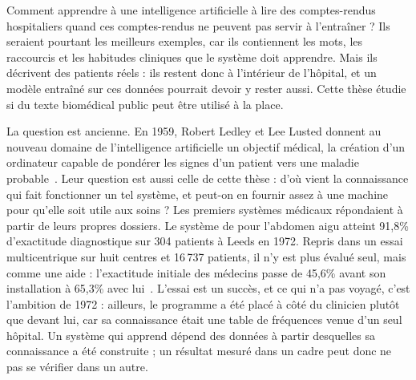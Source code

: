 

\noindent Comment apprendre à une intelligence artificielle à lire des comptes-rendus
hospitaliers quand ces comptes-rendus ne peuvent pas servir à l'entraîner ? Ils
seraient pourtant les meilleurs exemples, car ils contiennent les mots, les
raccourcis et les habitudes cliniques que le système doit apprendre. Mais ils
décrivent des patients réels : ils restent donc à l'intérieur de l'hôpital, et un
modèle entraîné sur ces données pourrait devoir y rester aussi. Cette thèse étudie
si du texte biomédical public peut être utilisé à la place.

La question est ancienne. En 1959, Robert Ledley et Lee Lusted donnent au nouveau
domaine de l'intelligence artificielle un objectif médical, la création d'un ordinateur capable
de pondérer les signes d'un patient vers une maladie probable~\citep{ledley_lusted_1959}.
Leur question est aussi celle de cette thèse : d'où vient la connaissance qui fait
fonctionner un tel système, et peut-on en fournir assez à une machine pour qu'elle
soit utile aux soins ? Les premiers systèmes médicaux répondaient à partir de leurs
propres dossiers. Le système de \citet{dedombal_1972} pour l'abdomen aigu atteint
91,8\% d'exactitude diagnostique sur 304 patients à Leeds en 1972. Repris dans un
essai multicentrique sur huit centres et 16\,737 patients, il n'y est plus évalué
seul, mais comme une aide : l'exactitude initiale des médecins passe de 45,6\% avant
son installation à 65,3\% avec lui~\citep{adams_1986}. L'essai est un succès, et ce
qui n'a pas voyagé, c'est l'ambition de 1972 : ailleurs, le programme a été placé à
côté du clinicien plutôt que devant lui, car sa connaissance était une table de
fréquences venue d'un seul hôpital. Un système qui apprend dépend des données à partir desquelles
sa connaissance a été construite ; un résultat mesuré dans un cadre peut donc ne pas
se vérifier dans un autre.

